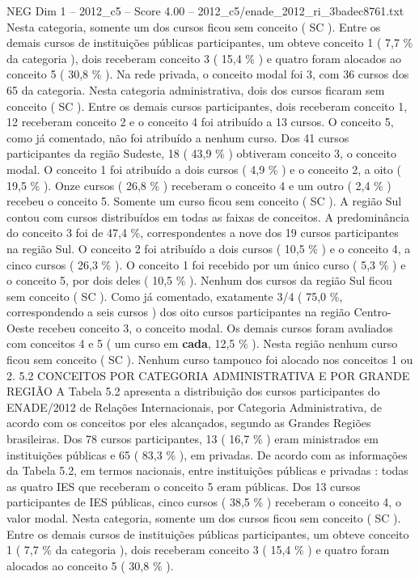 \begin{textsample}{NEG Dim 1 – 2012\_c5 – Score 4.00 – 2012\_c5/enade\_2012\_ri\_3badec8761.txt}
Nesta categoria, somente um dos cursos ficou sem conceito ( SC ).
Entre os demais cursos de instituições públicas participantes, um obteve conceito 1 ( 7,7 \% da categoria ), dois receberam conceito 3 ( 15,4 \% ) e quatro foram alocados ao conceito 5 ( 30,8 \% ).
Na rede privada, o conceito modal foi 3, com 36 cursos dos 65 da categoria.
Nesta categoria administrativa, dois dos cursos ficaram sem conceito ( SC ).
Entre os demais cursos participantes, dois receberam conceito 1, 12 receberam conceito 2 e o conceito 4 foi atribuído a 13 cursos.
O conceito 5, como já comentado, não foi atribuído a nenhum curso.
Dos 41 cursos participantes da região Sudeste, 18 ( 43,9 \% ) obtiveram conceito 3, o conceito modal.
O conceito 1 foi atribuído a dois cursos ( 4,9 \% ) e o conceito 2, a oito ( 19,5 \% ).
Onze cursos ( 26,8 \% ) receberam o conceito 4 e um outro ( 2,4 \% ) recebeu o conceito 5.
Somente um curso ficou sem conceito ( SC ).
A região Sul contou com cursos distribuídos em todas as faixas de conceitos.
A predominância do conceito 3 foi de 47,4 \%, correspondentes a nove dos 19 cursos participantes na região Sul.
O conceito 2 foi atribuído a dois cursos ( 10,5 \% ) e o conceito 4, a cinco cursos ( 26,3 \% ).
O conceito 1 foi recebido por um único curso ( 5,3 \% ) e o conceito 5, por dois deles ( 10,5 \% ).
Nenhum dos cursos da região Sul ficou sem conceito ( SC ).
Como já comentado, exatamente 3/4 ( 75,0 \%, correspondendo a seis cursos ) dos oito cursos participantes na região Centro-Oeste recebeu conceito 3, o conceito modal.
Os demais cursos foram avaliados com conceitos 4 e 5 ( um curso em \textbf{cada}, 12,5 \% ).
Nesta região nenhum curso ficou sem conceito ( SC ).
Nenhum curso tampouco foi alocado nos conceitos 1 ou 2. 5.2 CONCEITOS POR CATEGORIA ADMINISTRATIVA E POR GRANDE REGIÃO A Tabela 5.2 apresenta a distribuição dos cursos participantes do ENADE/2012 de Relações Internacionais, por Categoria Administrativa, de acordo com os conceitos por eles alcançados, segundo as Grandes Regiões brasileiras.
Dos 78 cursos participantes, 13 ( 16,7 \% ) eram ministrados em instituições públicas e 65 ( 83,3 \% ), em privadas.
De acordo com as informações da Tabela 5.2, em termos nacionais, entre instituições públicas e privadas : todas as quatro IES que receberam o conceito 5 eram públicas.
Dos 13 cursos participantes de IES públicas, cinco cursos ( 38,5 \% ) receberam o conceito 4, o valor modal.
Nesta categoria, somente um dos cursos ficou sem conceito ( SC ).
Entre os demais cursos de instituições públicas participantes, um obteve conceito 1 ( 7,7 \% da categoria ), dois receberam conceito 3 ( 15,4 \% ) e quatro foram alocados ao conceito 5 ( 30,8 \% ).

\end{textsample}
